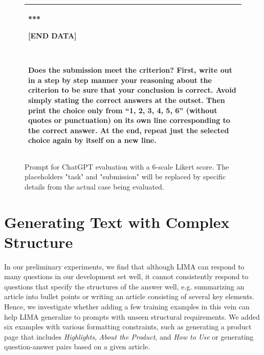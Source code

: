 \documentclass{article}
\begin{document}
\begin{figure}[t]
\begin{tabular}{@{}p{\columnwidth}@{}}
***

[END DATA]

~

Does the submission meet the criterion? First, write out in a step by step manner your reasoning about the criterion to be sure that your conclusion is correct. Avoid simply stating the correct answers at the outset. Then print the choice only from ``1, 2, 3, 4, 5, 6'' (without quotes or punctuation) on its own line corresponding to the correct answer. At the end, repeat just the selected choice again by itself on a new line.\\
\bottomrule
\end{tabular}
    \caption{Prompt for ChatGPT evaluation with a 6-scale Likert score. The placeholders "{task}" and "{submission}" will be replaced by specific details from the actual case being evaluated.}
    \label{fig:eval_prompt_single}
\end{figure}




\section{Generating Text with Complex Structure}
\label{sec:structure}

In our preliminary experiments, we find that although LIMA can respond to many questions in our development set well, it cannot consistently respond to questions that specify the structures of the answer well, e.g. summarizing an article into bullet points or writing an article consisting of several key elements. 
Hence, we investigate whether adding a few training examples in this vein can help LIMA generalize to prompts with unseen structural requirements.
We added six examples with various formatting constraints, such as generating a product page that includes \textit{Highlights}, \textit{About the Product}, and \textit{How to Use} or generating question-answer pairs based on a given article.
\end{document}
